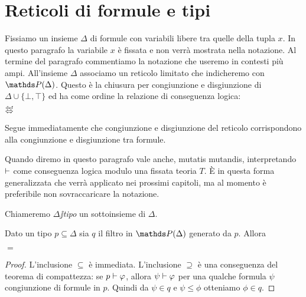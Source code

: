\section{Reticoli di formule e tipi}\label{frammenti}

\def\ceq#1#2#3{\hspace*{25ex}\llap{#1}\parbox{6ex}{\hfil#2}\rlap{#3}}

Fissiamo un insieme \emph{$\Delta$\/} di formule con variabili libere tra quelle della tupla \emph{$x$}. In questo paragrafo la variabile $x$ \`e fissata e non verr\`a mostrata nella notazione. Al termine del paragrafo commentiamo la notazione che useremo in contesti pi\`u ampi. All'insieme $\Delta$ associamo un reticolo limitato che indicheremo con \emph{$\PP(\Delta)$}. Questo \`e la chiusura per congiunzione e disgiunzione di $\Delta\cup\{\bot,\top\}$ ed ha come ordine la relazione di conseguenza logica:

\ceq{$\psi\le\phi$}{$\dIFF$}{$\psi\ \proves\ \phi$} 

Segue immediatamente che congiunzione e disgiunzione del reticolo corrispondono alla congiunzione e disgiunzione tra formule.

Quando diremo in questo paragrafo vale anche, mutatis mutandis, interpretando $\vdash$ come conseguenza logica modulo una fissata teoria $T$. \`E in questa forma generalizzata che verr\`a applicato nei prossimi capitoli, ma al momento \`e preferibile non sovraccaricare la notazione. 

Chiameremo \emph{$\Delta\jj$tipo\/} un sottoinsieme di $\Delta$. 

\begin{lemma}\label{poiuyhdsdfd}
Dato un tipo $p\subseteq\Delta$ sia $q$ il filtro in $\PP(\Delta)$ generato da $p$. Allora

\ceq{$q$}{$=$}{\Big\{$\ \phi\;\in\;\PP(\Delta)\ \ \ :\ \ \ p\ \proves\ \phi\ \Big\}$}

\end{lemma}
\begin{proof}
L'inclusione $\subseteq$ \`e immediata. L'inclusione $\supseteq$ \`e una conseguenza del teorema di compattezza: se $p\vdash\varphi$, allora $\psi\vdash\varphi$ per una qualche formula $\psi$ congiunzione di formule in $p$. Quindi da $\psi\in q$ e $\psi\le\phi$ otteniamo $\phi\in q$.
\end{proof}

